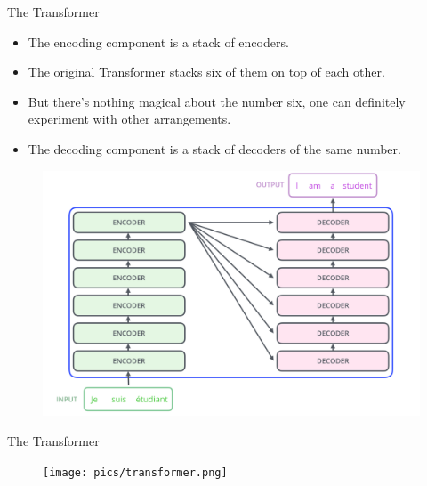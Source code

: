 \documentclass[handout]{beamer}
\begin{document}
\begin{frame}{The Transformer}
\begin{scriptsize}
 \begin{itemize}
  \item  The encoding component is a stack of encoders.
  \item The original Transformer stacks six of them on top of each other.
  \item But there’s nothing magical about the number six, one can definitely experiment with other arrangements. 
  \item The decoding component is a stack of decoders of the same number.
 \end{itemize}

\end{scriptsize}



     \begin{figure}[h]
        	\includegraphics[scale = 0.2]{pics/The_transformer_encoder_decoder_stack.png}
        \end{figure}  


\end{frame}


\begin{frame}{The Transformer}

     \begin{figure}[h]
        	\texttt{[image: pics/transformer.png]}
        \end{figure}  


\end{frame}
\end{document}

